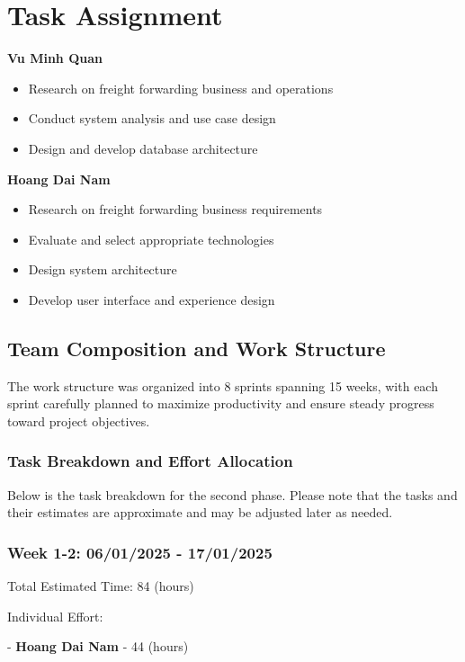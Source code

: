 \chapter{Task Assignment}

\textbf{Vu Minh Quan}
\begin{itemize}
\item Research on freight forwarding business and operations
\item Conduct system analysis and use case design
\item Design and develop database architecture
\end{itemize}

\textbf{Hoang Dai Nam}
\begin{itemize}
\item Research on freight forwarding business requirements
\item Evaluate and select appropriate technologies
\item Design system architecture
\item Develop user interface and experience design
\end{itemize}

\section{Team Composition and Work Structure}
The work structure was organized into 8 sprints spanning 15 weeks, with each sprint carefully planned to maximize productivity and ensure steady progress toward project objectives.

\subsection{Task Breakdown and Effort Allocation}
Below is the task breakdown for the second phase. Please note that the tasks and their estimates are approximate and may be adjusted later as needed.
\subsection*{Week 1-2: 06/01/2025 - 17/01/2025} 
Total Estimated Time: 84 (hours)

Individual Effort:

- \textbf{Hoang Dai Nam} - 44 (hours)

